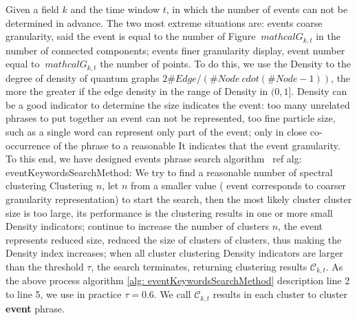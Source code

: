 \documentclass{sig-alternate-05-2015}
\begin{document}
Given a field \(k \) and the time window \(t \), in which the number of events can not be determined in advance.
The two most extreme situations are: events coarse granularity, said the event is equal to the number of Figure \(\ mathcal {G} _ {k, t} \) in the number of connected components; events finer granularity display, event number equal to \(\ mathcal {G} _ {k, t} \) the number of points.
To do this, we use the Density to the degree of density of quantum graphs \(2 \#Edge / (\# Node \ cdot (\# Node-1)) \), the more the greater if the edge density in the range of Density in \((0,1] \).
Density can be a good indicator to determine the size indicates the event: too many unrelated phrases to put together an event can not be represented, too fine particle size, such as a single word can represent only part of the event; only in close co-occurrence of the phrase to a reasonable It indicates that the event granularity.
To this end, we have designed events phrase search algorithm \ ref {alg: eventKeywordsSearchMethod}: We try to find a reasonable number of spectral clustering Clustering \(n \), let \(n \) from a smaller value ( event corresponds to coarser granularity representation) to start the search, then the most likely cluster cluster size is too large, its performance is the clustering results in one or more small Density indicators; continue to increase the number of clusters \(n \), the event represents reduced size, reduced the size of clusters of clusters, thus making the Density index increases; when all cluster clustering Density indicators are larger than the threshold \(\tau \), the search terminates, returning clustering results \(\mathcal{C}_{k, t}\).
As the above process algorithm \ref{alg: eventKeywordsSearchMethod} description line 2 to line 5, we use in practice \(\tau = 0.6 \).
We call \(\mathcal{C}_{k, t} \) results in each cluster to cluster \textbf{event} phrase.
\end{document}
